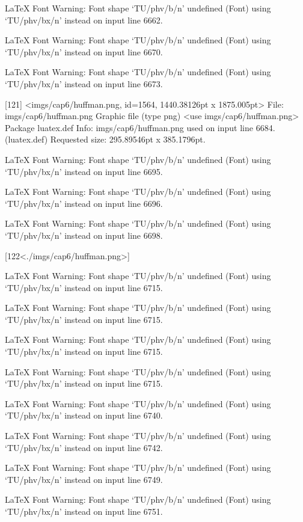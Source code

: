 LaTeX Font Warning: Font shape `TU/phv/b/n' undefined
(Font)              using `TU/phv/bx/n' instead on input line 6662.


LaTeX Font Warning: Font shape `TU/phv/b/n' undefined
(Font)              using `TU/phv/bx/n' instead on input line 6670.


LaTeX Font Warning: Font shape `TU/phv/b/n' undefined
(Font)              using `TU/phv/bx/n' instead on input line 6673.

[121]
<imgs/cap6/huffman.png, id=1564, 1440.38126pt x 1875.005pt>
File: imgs/cap6/huffman.png Graphic file (type png)
<use imgs/cap6/huffman.png>
Package luatex.def Info: imgs/cap6/huffman.png  used on input line 6684.
(luatex.def)             Requested size: 295.89546pt x 385.1796pt.

LaTeX Font Warning: Font shape `TU/phv/b/n' undefined
(Font)              using `TU/phv/bx/n' instead on input line 6695.


LaTeX Font Warning: Font shape `TU/phv/b/n' undefined
(Font)              using `TU/phv/bx/n' instead on input line 6696.


LaTeX Font Warning: Font shape `TU/phv/b/n' undefined
(Font)              using `TU/phv/bx/n' instead on input line 6698.

[122<./imgs/cap6/huffman.png>]

LaTeX Font Warning: Font shape `TU/phv/b/n' undefined
(Font)              using `TU/phv/bx/n' instead on input line 6715.


LaTeX Font Warning: Font shape `TU/phv/b/n' undefined
(Font)              using `TU/phv/bx/n' instead on input line 6715.


LaTeX Font Warning: Font shape `TU/phv/b/n' undefined
(Font)              using `TU/phv/bx/n' instead on input line 6715.


LaTeX Font Warning: Font shape `TU/phv/b/n' undefined
(Font)              using `TU/phv/bx/n' instead on input line 6715.


LaTeX Font Warning: Font shape `TU/phv/b/n' undefined
(Font)              using `TU/phv/bx/n' instead on input line 6740.


LaTeX Font Warning: Font shape `TU/phv/b/n' undefined
(Font)              using `TU/phv/bx/n' instead on input line 6742.


LaTeX Font Warning: Font shape `TU/phv/b/n' undefined
(Font)              using `TU/phv/bx/n' instead on input line 6749.


LaTeX Font Warning: Font shape `TU/phv/b/n' undefined
(Font)              using `TU/phv/bx/n' instead on input line 6751.

